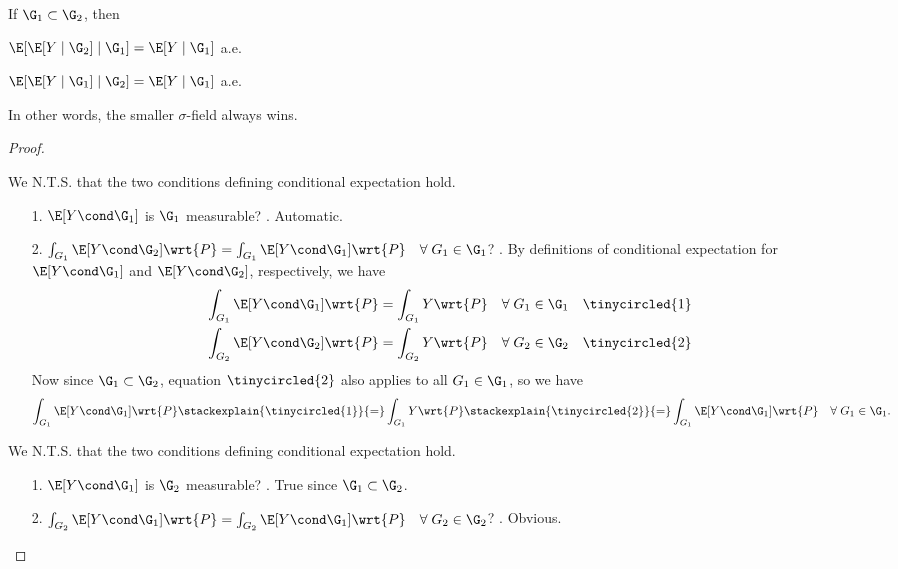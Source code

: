 \documentclass{article} %
\begin{document}
\begin{theorem}
If $\G_1 \subset \G_2$, then 
\begin{alphabate}
\item $\E[\E[Y \mid \G_2] \mid \G_1] = \E[Y \mid \G_1]$ a.e.
\item $\E[\E[Y \mid \G_1] \mid \G_2] = \E[Y \mid \G_1]$ a.e.
\end{alphabate}	
\label{thm:conditional_expectation_property_that_the_smaller_sigma_field_always_wins}
\end{theorem}

In other words, the smaller $\sigma$-field always wins.

\begin{proof}
\begin{alphabate}
\item We N.T.S. that the two conditions defining conditional expectation hold. 
\begin{itemize}
\item[1.] $\E[Y \cond \G_1]$ is $\G_1$ measurable? \greencheck. Automatic.
\item[2.] $\int_{G_1} \E[Y \cond \G_2] \wrt{P} = \int_{G_1} \E[Y \cond \G_1] \wrt{P} \quad \forall \; G_1 \in \G_1$? \greencheck.
By definitions of conditional expectation for $\E[Y \cond \G_1]$ and $\E[Y \cond \G_2]$, respectively, we have
\begin{align*}
\int_{G_1} \E[Y \cond \G_1] \wrt{P} &= \int_{G_1} Y \wrt{P} \quad \forall \; G_1 \in \G_1 && \tinycircled{1} \\
\int_{G_2} \E[Y \cond \G_2] \wrt{P} &= \int_{G_2} Y \wrt{P} \quad \forall \; G_2 \in \G_2 && \tinycircled{2} \\
\end{align*}
Now since $\G_1 \subset \G_2$, equation $\tinycircled{2}$ also applies to all $G_1 \in \G_1$, so we have
\[ \int_{G_1} \E[Y \cond \G_1] \wrt{P} \stackexplain{\tinycircled{1}}{=}  \int_{G_1} Y \wrt{P}  \stackexplain{\tinycircled{2}}{=}  \int_{G_1} \E[Y \cond \G_1] \wrt{P} \quad \forall \; G_1 \in \G_1. \]
 
\end{itemize}
\item We N.T.S. that the two conditions defining conditional expectation hold.  
\begin{itemize}
\item[1.] $\E[Y \cond \G_1]$ is $\G_2$ measurable? \greencheck. True since $\G_1 \subset \G_2$. 
\item[2.] $\int_{G_2} \E[Y \cond \G_1] \wrt{P} = \int_{G_2} \E[Y \cond \G_1] \wrt{P} \quad \forall \; G_2 \in \G_2$?  \greencheck. Obvious.
\end{itemize}	
\end{alphabate}	

\end{proof}
\end{document}
